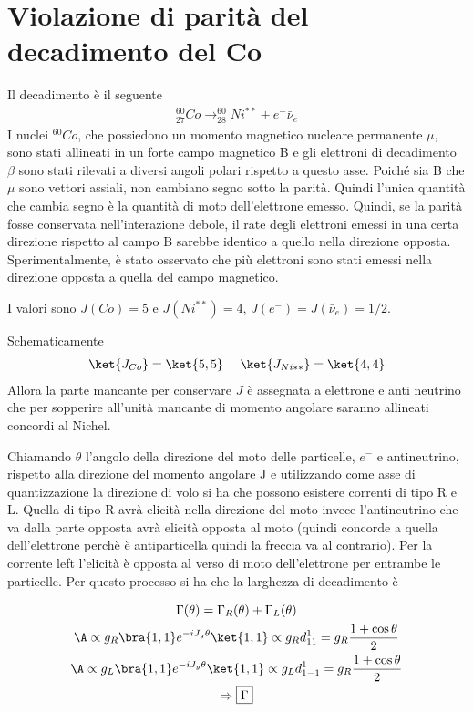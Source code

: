 \documentclass[12pt]{book}
\begin{document}
\section{Violazione di parità del decadimento del Co}
Il decadimento è il seguente
\begin{gather}
	_{27}^{60}Co \rightarrow _{28}^{60}Ni^{**} + e^- \bar \nu_e
\end{gather}
I nuclei $^{60}Co$, che possiedono un momento magnetico nucleare permanente $\mu$, sono stati allineati in un forte campo magnetico B e gli elettroni di decadimento $\beta$ sono stati rilevati a diversi angoli polari rispetto a questo asse. Poiché sia B che $\mu$ sono vettori assiali, non cambiano segno sotto la parità. Quindi l'unica quantità che cambia segno è la quantità di moto dell'elettrone emesso. Quindi, se la parità fosse conservata nell'interazione debole, il rate degli elettroni emessi in una certa direzione rispetto al campo B sarebbe identico a quello nella direzione opposta. Sperimentalmente, è stato osservato che più elettroni sono stati emessi nella direzione opposta a quella del campo magnetico.

I valori sono $J(Co)=5$ e $J(Ni^{**})=4$, $J(e^-)=J(\bar \nu_e)=1/2$. 

Schematicamente
\begin{gather}
	\ket{J_{Co}}= \ket{5,5} \ \ \ \ \ket{J_{Ni**}}=\ket{4,4}
\end{gather}
Allora la parte mancante per conservare $J$ è assegnata a elettrone e anti neutrino che per sopperire all'unità mancante di momento angolare saranno allineati concordi al Nichel. 

Chiamando $\theta$ l'angolo della direzione del moto delle particelle, $e^-$ e antineutrino, rispetto alla direzione del momento angolare J e utilizzando come asse di quantizzazione la direzione di volo si ha che possono esistere correnti di tipo R e L. Quella di tipo R avrà elicità nella direzione del moto invece l'antineutrino che va dalla parte opposta avrà elicità opposta al moto (quindi concorde a quella dell'elettrone perchè è antiparticella quindi la freccia va al contrario). Per la corrente left l'elicità è opposta al verso di moto dell'elettrone per entrambe le particelle. Per questo processo si ha che la larghezza di decadimento è

\begin{gather}
	\Gamma (\theta) = \Gamma_R(\theta) + \Gamma_L (\theta)\\
	\A \propto g_R 	\bra{1,1} e^{-iJ_y \theta} \ket{1,1} \propto g_R d_{11}^1= g_R \frac{1+ \cos \theta}{2}\\
	\A \propto g_L \bra{1,1} e^{-iJ_y \theta} \ket{1,1} \propto g_L d_{1-1}^1 = g_R \frac{1+\cos \theta}{2}\\
	\Rightarrow 	\boxed{\Gamma  }
\end{gather}
\end{document}
